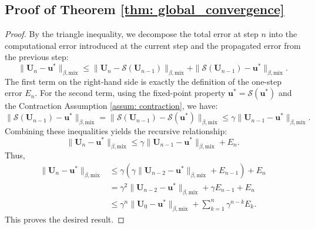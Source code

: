 \documentclass[twoside,11pt]{article}
\newcommand{\1}{\mathbf{1}}
\numberwithin{equation}{section}
\begin{document}
\subsection{Proof of Theorem \ref{thm: global_convergence}}
\begin{proof}
By the triangle inequality, we decompose the total error at step $n$ into the computational error introduced at the current step and the propagated error from the previous step:
\begin{equation}
    \|\mathbf{U}_n - \mathbf{u}^*\|_{\beta, \text{mix}} \le \|\mathbf{U}_n - \mathcal{S}(\mathbf{U}_{n-1})\|_{\beta, \text{mix}} + \|\mathcal{S}(\mathbf{U}_{n-1}) - \mathbf{u}^*\|_{\beta, \text{mix}}.
\end{equation}
The first term on the right-hand side is exactly the definition of the one-step error $E_n$. For the second term, using the fixed-point property $\mathbf{u}^* = \mathcal{S}(\mathbf{u}^*)$ and the Contraction Assumption \ref{assum: contraction}, we have:
\begin{equation}
    \|\mathcal{S}(\mathbf{U}_{n-1}) - \mathbf{u}^*\|_{\beta, \text{mix}} = \|\mathcal{S}(\mathbf{U}_{n-1}) - \mathcal{S}(\mathbf{u}^*)\|_{\beta, \text{mix}} \le \gamma \|\mathbf{U}_{n-1} - \mathbf{u}^*\|_{\beta, \text{mix}}.
\end{equation}
Combining these inequalities yields the recursive relationship:
\begin{equation}
    \|\mathbf{U}_n - \mathbf{u}^*\|_{\beta, \text{mix}} \le \gamma \|\mathbf{U}_{n-1} - \mathbf{u}^*\|_{\beta, \text{mix}} + E_n.
\end{equation}
Thus,
\begin{align*}
    \|\mathbf{U}_n - \mathbf{u}^*\|_{\beta, \text{mix}} &\le \gamma \left( \gamma \|\mathbf{U}_{n-2} - \mathbf{u}^*\|_{\beta, \text{mix}} + E_{n-1} \right) + E_n \nonumber \\
    &= \gamma^2 \|\mathbf{U}_{n-2} - \mathbf{u}^*\|_{\beta, \text{mix}} + \gamma E_{n-1} + E_n \nonumber \\
    &\le \gamma^n \|\mathbf{U}_0 - \mathbf{u}^*\|_{\beta, \text{mix}} + \sum_{k=1}^n \gamma^{n-k} E_k.
\end{align*}
This proves the desired result.
\end{proof}
\end{document}
